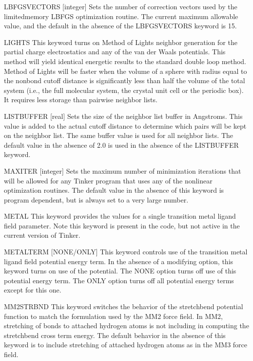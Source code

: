 \documentclass[letterpaper,11pt,english]{sphinxmanual}
\begin{document}
LBFGS\sphinxhyphen{}VECTORS {[}integer{]}     Sets the number of correction vectors used by the limited\sphinxhyphen{}memory L\sphinxhyphen{}BFGS optimization routine. The current maximum allowable value, and the default in the absence of the LBFGS\sphinxhyphen{}VECTORS keyword is 15.

LIGHTS     This keyword turns on Method of Lights neighbor generation for the partial charge electrostatics and any of the van der Waals potentials. This method will yield identical energetic results to the standard double loop method. Method of Lights will be faster when the volume of a sphere with radius equal to the nonbond cutoff distance is significantly less than half the volume of the total system (i.e., the full molecular system, the crystal unit cell or the periodic box). It requires less storage than pairwise neighbor lists.

LIST\sphinxhyphen{}BUFFER {[}real{]}     Sets the size of the neighbor list buffer in Angstroms. This value is added to the actual cutoff distance to determine which pairs will be kept on the neighbor list. The same buffer value is used for all neighbor lists. The default value in the absence of 2.0 is used in the absence of the LIST\sphinxhyphen{}BUFFER keyword.

MAXITER {[}integer{]}     Sets the maximum number of minimization iterations that will be allowed for any Tinker program that uses any of the nonlinear optimization routines. The default value in the absence of this keyword is program dependent, but is always set to a very large number.

METAL     This keyword provides the values for a single transition metal ligand field parameter. Note this keyword is present in the code, but not active in the current version of Tinker.

METALTERM {[}NONE/ONLY{]}     This keyword controls use of the transition metal ligand field potential energy term. In the absence of a modifying option, this keyword turns on use of the potential. The NONE option turns off use of this potential energy term. The ONLY option turns off all potential energy terms except for this one.

MM2\sphinxhyphen{}STRBND     This keyword switches the behavior of the stretch\sphinxhyphen{}bend potential function to match the formulation used by the MM2 force field. In MM2, stretching of bonds to attached hydrogen atoms is not including in computing the stretch\sphinxhyphen{}bend cross term energy. The default behavior in the absence of this keyword is to include stretching of attached hydrogen atoms as in the MM3 force field.
\end{document}
